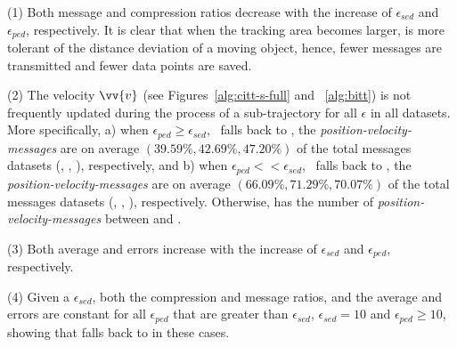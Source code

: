 {\ni (1) Both message and compression ratios decrease with the increase of $\epsilon_{sed}$ and $\epsilon_{ped}$, respectively. It is clear that when the tracking area becomes larger, \bitt is more tolerant of the distance deviation of a moving object, hence, fewer messages are transmitted and fewer data points are saved.

\ni (2) The velocity  $\vv{v}$ (see Figures~\ref{alg:citt-s-full} and ~\ref{alg:bitt}) is not frequently updated during the process of a sub-trajectory for all $\epsilon$ in all datasets. More specifically, a) when $\epsilon_{ped} \ge \epsilon_{sed}$, \ie~\bitt falls back to \citt, the \emph{position-velocity-messages} are on average $(39.59\%, 42.69\%, 47.20\%)$ of the total messages \wrt datasets (\mopsi, \sercar, \geolife), respectively, and b) when $\epsilon_{ped} << \epsilon_{sed}$, \ie~\bitt falls back to \sitt, the \emph{position-velocity-messages} are on average $(66.09\%, 71.29\%, 70.07\%)$ of the total messages \wrt datasets (\mopsi, \sercar, \geolife), respectively. Otherwise, \bitt has the number of \emph{position-velocity-messages} between \citt and \sitt.


\ni (3) Both average \ped and \sed errors increase with the increase of $\epsilon_{sed}$ and $\epsilon_{ped}$, respectively.

\ni (4) Given a $\epsilon_{sed}$, both the compression and message ratios, and the average \sed and \ped errors are constant for all $\epsilon_{ped}$ that are greater than $\epsilon_{sed}$, \eg $\epsilon_{sed}=10$ and $\epsilon_{ped} \ge 10$, showing that \bitt falls back to \citt in these cases.




}
